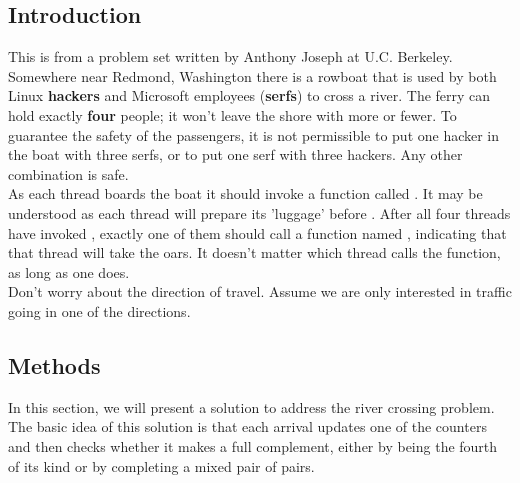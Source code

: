 \documentclass[a4paper, 10pt]{article}
\begin{document}
\subsection{Introduction}
\quad This is from a problem set written by Anthony Joseph at U.C. Berkeley. Somewhere near Redmond, Washington there is a rowboat that is used by both Linux \textbf{hackers} and Microsoft employees (\textbf{serfs}) to cross a river. The ferry can hold exactly \textbf{four} people; it won’t leave the shore with more or fewer. To guarantee the safety of the passengers, it is not permissible to put one hacker in the boat with three serfs, or to put one serf with three hackers. Any other combination is safe.\\
\hspace*{1em} As each thread boards the boat it should invoke a function called {}. It may be understood as each thread will prepare its 'luggage' before {}.
After all four threads have invoked {}, exactly one of them should call a function named {}, indicating that that thread will take the oars. It doesn’t matter which thread calls the function, as long as one does.\\
\hspace*{1em} Don’t worry about the direction of travel. Assume we are only interested in traffic going in one of the directions. 
\subsection{Methods}
\quad In this section, we will present a solution to address the river crossing problem. The basic idea of this solution is that each arrival updates one of the counters and then checks whether it makes a full complement, either by being the fourth of its kind or by completing a mixed pair of pairs.
\end{document}
